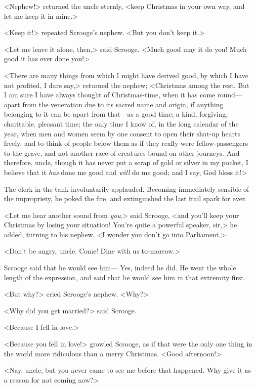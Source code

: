 <Nephew!> returned the uncle sternly, <keep Christmas in your own way, and let
me keep it in mine.>

<Keep it!> repeated Scrooge's nephew. <But you don't keep it.>

<Let me leave it alone, then,> said Scrooge. <Much good may it do you! Much good
it has ever done you!>

<There are many things from which I might have derived good, by which I have not
profited, I dare say,> returned the nephew; <Christmas among the rest. But I am
sure I have always thought of Christmas-time, when it has come round—apart from
the veneration due to its sacred name and origin, if anything belonging to it
can be apart from that—as a good time; a kind, forgiving, charitable, pleasant
time; the only time I know of, in the long calendar of the year, when men and
women seem by one consent to open their shut-up hearts freely, and to think of
people below them as if they really were fellow-passengers to the grave, and not
another race of creatures bound on other journeys. And therefore, uncle, though
it has never put a scrap of gold or silver in my pocket, I believe that it
\emph{has} done me good and \emph{will} do me good; and I say, God bless it!>

The clerk in the tank involuntarily applaud\-ed. Becoming immediately sensible of
the impropriety, he poked the fire, and extinguished the last frail spark for
ever.

<Let me hear another sound from \emph{you},> said Scrooge, <and you'll keep your
Christmas by losing your situation! You're quite a powerful speaker, sir,> he
added, turning to his nephew. <I wonder you don't go into Parliament.>

<Don't be angry, uncle. Come! Dine with us to-morrow.>

Scrooge said that he would see him--- Yes, indeed he did. He went the whole
length of the expression, and said that he would see him in that extremity
first.

<But why?> cried Scrooge's nephew. <Why?>

<Why did you get married?> said Scrooge.

<Because I fell in love.>

<Because you fell in love!> growled Scrooge, as if that were the only one thing
in the world more ridiculous than a merry Christmas. <Good afternoon!>

<Nay, uncle, but you never came to see me before that happened. Why give it as a
reason for not coming now?>

